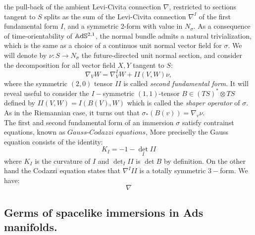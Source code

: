 the pull-back of the ambient Levi-Civita connection $\nabla$, restricted to sections tangent to $S$ splits as the sum of the Levi-Civita connection $\nabla^I$ of the first fundamental form $I$, and a symmetric 2-form with value in $N_\sigma$. As a consequence of time-orientability of $\mathbb{A}\mathrm{d}\mathbb{S}^{2,1}$, the normal bundle admits a natural trivialization, which is the same as a choice of a continuos unit normal vector field for $\sigma.$ We will denote by $\nu:S\to N_\sigma$ the future-directed unit normal section, and consider the decomposition for all vector field $X,Y$ tangent to $S$: 
\[
    \nabla_V W=\nabla^I_V W+II(V,W)\nu,
\]
where the symmetric $(2,0)$ tensor $II$ is called \textit{second fundamental form}. It will reveal useful to consider the $I-$symmetric $(1,1)$-tensor $B\in (TS)^*\otimes TS$ defined by $II(V,W)=I(B(V),W)$ which is called the \textit{shaper operator} of $\sigma.$ As in the Riemannian case, it turns out that $\sigma_*(B(v))=\nabla_v\nu.$\\  
The first and second fundamental form of an immersion $\sigma$ satisfy contrainst equations, known as $\textit{Gauss-Codazzi equations}$, More preciselly the Gauss equation consists of the identity: 
\[K_I=-1-\det_I II\] where $K_I$ is the curvature of $I$ and $\det_I II$ is $\det B$ by definition. On the other hand the Codazzi equation states that $\nabla^III$ is a totally symmetric $3-$form. We have: 
\begin{equation} \nabla 
\end{equation}

\subsection{Germs of spacelike immersions in Ads manifolds.}

